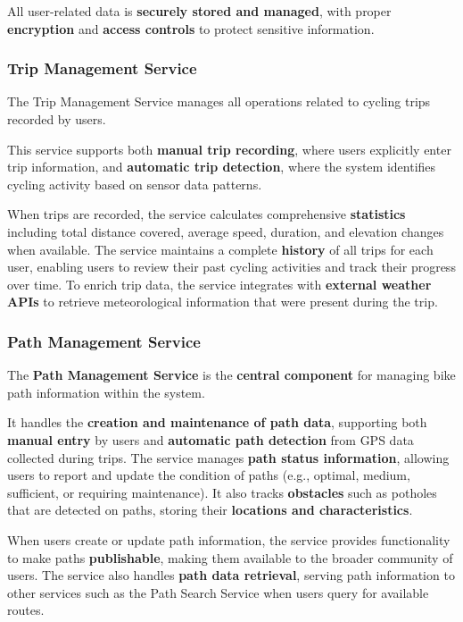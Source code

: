 All user-related data is \textbf{securely stored and managed}, with proper \textbf{encryption} and \textbf{access controls} to protect sensitive information.

\subsubsection{Trip Management Service}
The Trip Management Service manages all operations related to cycling trips recorded by users. 

This service supports both \textbf{manual trip recording}, where users explicitly enter trip information, and \textbf{automatic trip detection}, where the system identifies cycling activity based on sensor data patterns. 

When trips are recorded, the service calculates comprehensive \textbf{statistics} including total distance covered, average speed, duration, and elevation changes when available. The service maintains a complete \textbf{history} of all trips for each user, enabling users to review their past cycling activities and track their progress over time. To enrich trip data, the service integrates with \textbf{external weather APIs} to retrieve meteorological information that were present during the trip.

\subsubsection{Path Management Service}
The \textbf{Path Management Service} is the \textbf{central component} for managing bike path information within the system. 

It handles the \textbf{creation and maintenance of path data}, supporting both \textbf{manual entry} by users and \textbf{automatic path detection} from GPS data collected during trips. The service manages \textbf{path status information}, allowing users to report and update the condition of paths (e.g., optimal, medium, sufficient, or requiring maintenance). It also tracks \textbf{obstacles} such as potholes that are detected on paths, storing their \textbf{locations and characteristics}. 

When users create or update path information, the service provides functionality to make paths \textbf{publishable}, making them available to the broader community of users. The service also handles \textbf{path data retrieval}, serving path information to other services such as the Path Search Service when users query for available routes.

